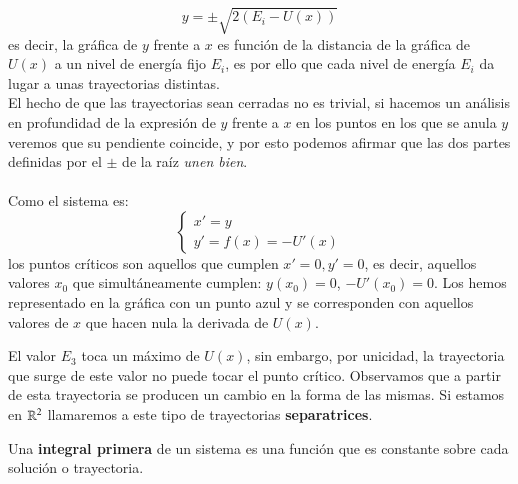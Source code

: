 \begin{eg}
$$        y = \pm \sqrt{2(E_i - U(x))}
    $$
    es decir, la gráfica de $y$ frente a $x$ es función de la distancia de la gráfica de $U(x)$ a un nivel de energía fijo $E_i$, es por ello que cada nivel de energía $E_i$ da lugar a unas trayectorias distintas.\\
    El hecho de que las trayectorias sean cerradas no es trivial, si hacemos un análisis en profundidad de la expresión de $y$ frente a $x$ en los puntos en los que se anula $y$ veremos que su pendiente coincide, y por esto podemos afirmar que las dos partes definidas por el $\pm$ de la raíz \textit{unen bien}.\\\\
    Como el sistema es:
    $$
        \begin{cases}
            x' = y\\
            y' = f(x) = -U'(x)
        \end{cases}
    $$
    los puntos críticos son aquellos que cumplen $x' = 0, y' = 0$, es decir, aquellos valores $x_0$ que simultáneamente cumplen: $y(x_0) = 0$, $-U'(x_0) = 0$. Los hemos representado en la gráfica con un punto azul y se corresponden con aquellos valores de $x$ que hacen nula la derivada de $U(x)$.

    El valor $E_3$ toca un máximo de $U(x)$, sin embargo, por unicidad, la trayectoria que surge de este valor no puede tocar el punto crítico. Observamos que a partir de esta trayectoria se producen un cambio en la forma de las mismas. Si estamos en $\mathbb{R}^2$ llamaremos a este tipo de trayectorias \textbf{separatrices}.
\end{eg}

\begin{dfn}\label{dfn:iteg-prim}
    Una \textbf{integral primera} de un sistema es una función que es constante sobre cada solución o trayectoria.
\end{dfn}

